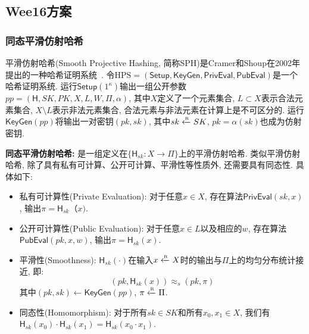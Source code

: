 \subsection{Wee16方案}
\subsubsection{同态平滑仿射哈希}
平滑仿射哈希(Smooth Projective Hashing, 简称SPH)是Cramer和Shoup在2002年提出的一种哈希证明系统~\cite{CS-EUROCRYPT-2002}. 令$\text{HPS} = (\mathsf{Setup}, \mathsf{KeyGen}, \mathsf{PrivEval}, \mathsf{PubEval})$是一个哈希证明系统. 运行$\mathsf{Setup}(1^\kappa)$输出一组公开参数$pp = (\mathsf{H}, SK, PK, X, L, W, \Pi, \alpha)$, 其中$X$定义了一个元素集合, $L \subset X$表示合法元素集合, $X \setminus L$表示非法元素集合, 合法元素与非法元素在计算上是不可区分的. 运行$\mathsf{KeyGen}(pp)$将输出一对密钥$(pk, sk)$, 其中$sk \xleftarrow{\textup{\tiny R}} SK$, $pk = \alpha (sk)$也成为仿射密钥.

\begin{trivlist}
\item \textbf{同态平滑仿射哈希:} 是一组定义在$\{\mathsf{H}_{sk}: X \rightarrow \Pi\}$上的平滑仿射哈希. 类似平滑仿射哈希, 除了具有私有可计算、公开可计算、平滑性等性质外, 还需要具有同态性. 具体如下:
\begin{itemize}
\item 私有可计算性(Private Evaluation): 对于任意$x \in X$, 存在算法$\mathsf{PrivEval}(sk, x)$, 输出$\pi = \mathsf{H}_{sk}（x)$.

\item 公开可计算性(Public Evaluation): 对于任意$x \in L$以及相应的$w$, 存在算法$\mathsf{PubEval}(pk, x, w)$, 输出$\pi = \mathsf{H}_{sk}(x)$.

\item 平滑性(Smoothness): $\mathsf{H}_{sk}(\cdot)$在输入$x \xleftarrow{\textup{\tiny R}} X$时的输出与$\Pi$上的均匀分布统计接近, 即: 
\begin{equation*}
    (pk, \mathsf{H}_{sk}(x)) \approx_s (pk, \pi)
\end{equation*}
其中$(pk, sk) \leftarrow \mathsf{KeyGen}(pp)$, $\pi \xleftarrow{\textup{\tiny R}} \Pi$.

\item 同态性(Homomorphism): 对于所有$sk \in SK$和所有$x_0, x_1 \in X$, 我们有$\mathsf{H}_{sk}(x_0)\cdot \mathsf{H}_{sk}(x_1) = \mathsf{H}_{sk}(x_0 \cdot x_1)$.   
\end{itemize}
\end{trivlist}

